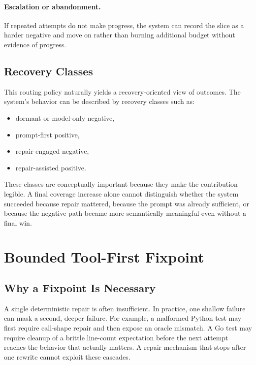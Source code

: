 \documentclass[10pt]{article}
\begin{document}
\paragraph{Escalation or abandonment.}
If repeated attempts do not make progress, the system can record the slice as a harder negative and move on rather than burning additional budget without evidence of progress.

\subsection{Recovery Classes}

This routing policy naturally yields a recovery-oriented view of outcomes. The system's behavior can be described by recovery classes such as:

\begin{itemize}[leftmargin=1.4em]
    \item dormant or model-only negative,
    \item prompt-first positive,
    \item repair-engaged negative,
    \item repair-assisted positive.
\end{itemize}

These classes are conceptually important because they make the contribution legible. A final coverage increase alone cannot distinguish whether the system succeeded because repair mattered, because the prompt was already sufficient, or because the negative path became more semantically meaningful even without a final win.

\section{Bounded Tool-First Fixpoint}
\label{sec:fixpoint}

\subsection{Why a Fixpoint Is Necessary}

A single deterministic repair is often insufficient. In practice, one shallow failure can mask a second, deeper failure. For example, a malformed Python test may first require call-shape repair and then expose an oracle mismatch. A Go test may require cleanup of a brittle line-count expectation before the next attempt reaches the behavior that actually matters. A repair mechanism that stops after one rewrite cannot exploit these cascades.
\end{document}
